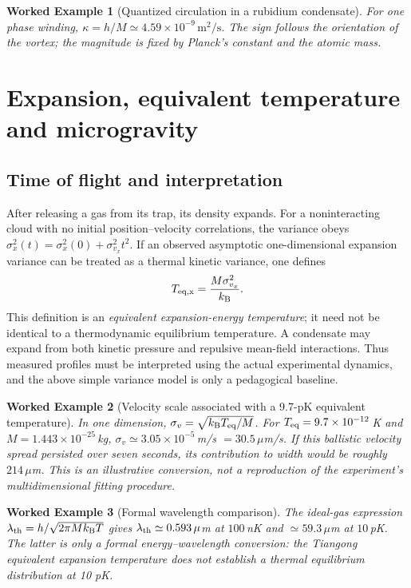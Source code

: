 \documentclass[11pt,a4paper]{article}
\newtheorem{example}{Worked Example}
\newcommand{\kb}{k_{\mathrm B}}
\begin{document}
\begin{example}[Quantized circulation in a rubidium condensate]
For one phase winding, $\kappa=h/M\simeq4.59\times10^{-9}\,\mathrm{m^2/s}$. The sign follows the orientation of the vortex; the magnitude is fixed by Planck's constant and the atomic mass.
\end{example}

\section{Expansion, equivalent temperature and microgravity}
\subsection{Time of flight and interpretation}
After releasing a gas from its trap, its density expands. For a noninteracting cloud with no initial position--velocity correlations, the variance obeys $\sigma_x^2(t)=\sigma_x^2(0)+\sigma_{v_x}^2t^2$. If an observed asymptotic one-dimensional expansion variance can be treated as a thermal kinetic variance, one defines
\begin{equation}
T_{\rm eq,x}=\frac{M\sigma_{v_x}^2}{\kb}.
\end{equation}
This definition is an \emph{equivalent expansion-energy temperature}; it need not be identical to a thermodynamic equilibrium temperature. A condensate may expand from both kinetic pressure and repulsive mean-field interactions. Thus measured profiles must be interpreted using the actual experimental dynamics, and the above simple variance model is only a pedagogical baseline.

\begin{example}[Velocity scale associated with a 9.7-pK equivalent temperature]
In one dimension, $\sigma_v=\sqrt{\kb T_{\rm eq}/M}$. For $T_{\rm eq}=9.7\times10^{-12}\,$K and $M=1.443\times10^{-25}\,$kg, $\sigma_v\simeq3.05\times10^{-5}\,$m/s $=30.5\,\mu$m/s. If this ballistic velocity spread persisted over seven seconds, its contribution to width would be roughly $214\,\mu$m. This is an illustrative conversion, not a reproduction of the experiment's multidimensional fitting procedure.
\end{example}

\begin{example}[Formal wavelength comparison]
The ideal-gas expression $\lambda_{\rm th}=h/\sqrt{2\pi M\kb T}$ gives $\lambda_{\rm th}\simeq0.593\,\mu$m at $100\,$nK and $\simeq59.3\,\mu$m at $10\,$pK. The latter is only a formal energy--wavelength conversion: the Tiangong equivalent expansion temperature does not establish a thermal equilibrium distribution at 10 pK.
\end{example}
\end{document}
